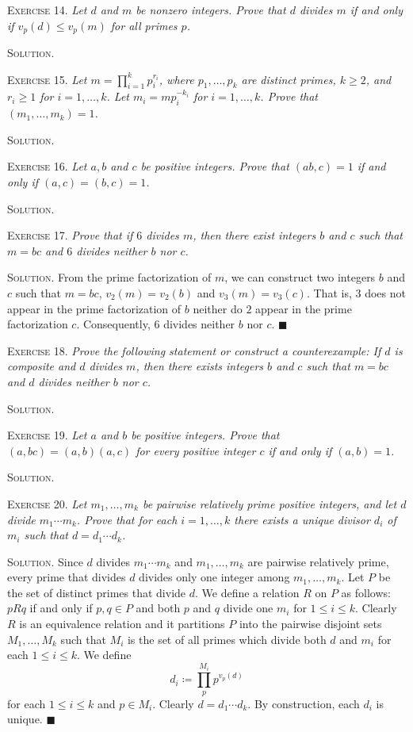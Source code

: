 \documentclass[11pt, leqno]{article}
\newcommand{\done}{\ensuremath{\blacksquare}}
\begin{document}
\textsc{Exercise 14}. \emph{Let $d$ and $m$ be nonzero integers. Prove that $d$ divides $m$ if and only if $v_p(d)\leq v_p(m)$ for all primes $p$.}

\textsc{Solution}.

\textsc{Exercise 15}. \emph{Let $m = \prod_{i=1}^k p_i^{r_i}$, where $p_1, \ldots, p_k$ are distinct primes, $k \geq 2$, and $r_i\geq 1$ for $i=1,\ldots, k$. Let $m_i = mp_i^{-k_i}$ for $i=1,\ldots, k$. Prove that $(m_1, \ldots, m_k) = 1$.}

\textsc{Solution}.

\textsc{Exercise 16}. \emph{Let $a, b$ and $c$ be positive integers. Prove that $(ab, c)=1$ if and only if $(a,c) = (b,c) = 1$.}

\textsc{Solution}.

\textsc{Exercise 17}. \emph{Prove that if $6$ divides $m$, then there exist integers $b$ and $c$ such that $m=bc$ and $6$ divides neither $b$ nor $c$.}

\textsc{Solution}. From the prime factorization of $m$, we can construct two integers $b$ and $c$ such that $m=bc$, $v_2(m) = v_2(b)$ and $v_3(m) = v_3(c)$. That is, $3$ does not appear in the prime factorization of $b$ neither do $2$ appear in the prime factorization $c$. Consequently, $6$ divides neither $b$ nor $c$. \done

\textsc{Exercise 18}. \emph{Prove the following statement or construct a counterexample: If $d$ is composite and $d$ divides $m$, then there exists integers $b$ and $c$ such that $m=bc$ and $d$ divides neither $b$ nor $c$.}

\textsc{Solution}.

\textsc{Exercise 19}. \emph{Let $a$ and $b$ be positive integers. Prove that $(a,bc) = (a,b)(a,c)$ for every positive integer $c$ if and only if $(a,b)=1$.}

\textsc{Solution}.

\textsc{Exercise 20}. \emph{Let $m_1, \ldots, m_k$ be pairwise relatively prime positive integers, and let $d$ divide $m_1\cdots m_k$. Prove that for each $i = 1, \ldots, k$ there exists a unique divisor $d_i$ of $m_i$ such that $d= d_1\cdots d_k$.}

\textsc{Solution}. Since $d$ divides $m_1\cdots m_k$ and $m_1, \ldots, m_k$ are pairwise relatively prime, every prime that divides $d$ divides only one integer among $m_1, \ldots, m_k$. Let $P$ be the set of distinct primes that divide $d$. We define a relation $R$ on $P$ as follows: $pRq$ if and only if $p,q\in P$ and both $p$ and $q$ divide one $m_i$ for $1\leq i \leq k$. Clearly $R$ is an equivalence relation and it partitions $P$ into the pairwise disjoint sets $M_1, \ldots, M_k$ such that $M_i$ is the set of all primes which divide both $d$ and $m_i$ for each $1 \leq i \leq k$. We define 
\begin{displaymath}
d_i \coloneqq \prod_p^{M_i} p^{v_p(d)}
\end{displaymath}
for each $1 \leq i \leq k$ and $p\in M_i$. Clearly $d = d_1\cdots d_k$. By construction, each $d_i$ is unique. \done
\end{document}
